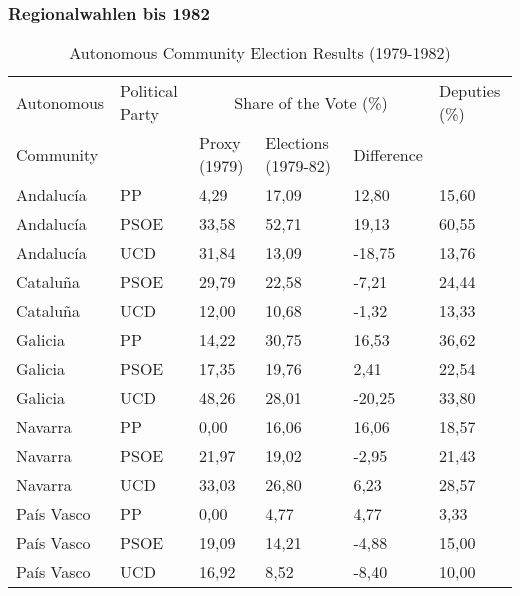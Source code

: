 \documentclass[12pt]{beamer}
\begin{document}
\begin{frame}
\frametitle{Regionalwahlen bis 1982}
\begin{table}
\caption{Autonomous Community Election Results (1979-1982)} \label{tab:AC1979-82}
\tiny
\begin{tabular}{llllll}
\toprule
Autonomous  & Political Party &  \multicolumn{3}{c}{Share of the Vote (\%)} & Deputies (\%) \\  \cmidrule{3-5}
Community& & Proxy (1979) & Elections (1979-82) & Difference &\\ \midrule
Andalucía&PP&4,29&17,09&12,80&15,60 \\
Andalucía&PSOE&33,58&52,71&19,13&60,55 \\
Andalucía&UCD&31,84&13,09&-18,75&13,76 \\
Cataluña&PSOE&29,79&22,58&-7,21&24,44 \\
Cataluña&UCD&12,00&10,68&-1,32&13,33 \\
Galicia&PP&14,22&30,75&16,53&36,62 \\
Galicia&PSOE&17,35&19,76&2,41&22,54 \\
Galicia&UCD&48,26&28,01&-20,25&33,80\\
Navarra&PP&0,00&16,06&16,06&18,57\\
Navarra&PSOE&21,97&19,02&-2,95&21,43\\
Navarra&UCD&33,03&26,80&6,23&28,57\\
País Vasco&PP&0,00&4,77&4,77&3,33\\
País Vasco&PSOE&19,09&14,21&-4,88&15,00\\
País Vasco&UCD&16,92&8,52&-8,40&10,00\\ 
\bottomrule
\end{tabular}
\end{table}
\end{frame}
\end{document}
